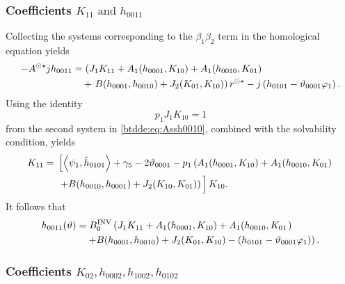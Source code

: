 \subsubsection{Coefficients \texorpdfstring{$K_{11} \text{ and } h_{0011}$}{K11
				and h0011}}

Collecting the systems corresponding to the $\beta_1 \beta_2$ term in the
homological equation yields
\begin{equation}
\label{btdde:eq:Assh0011}
\begin{aligned}
-A^{\odot\star} jh_{0011} &= \left(J_1 K_{11} + A_1(h_{0001},K_{10}) + A_1(h_{0010},K_{01}) \right. \\
						& \quad +
                        \left. B(h_{0001},h_{0010}) + J_2(K_{01},K_{10})\right)r^{\odot\star} - j\left(h_{0101}-\vartheta_{0001}\varphi_1\right).
\end{aligned}
\end{equation}
Using the identity 
%
\begin{equation*}
   p_1J_1K_{10}=1 
\end{equation*}
from the second system in \cref{btdde:eq:Assh0010}, combined with the solvability
condition, yields
\begin{equation}
\begin{aligned}
    K_{11}={}& \left[\left< \psi_1, \hat h_{0101} \right> + \gamma_5 - 2\vartheta_{0001} 
                 - p_1\left(A_1(h_{0001},K_{10}) + A_1(h_{0010},K_{01}) \right. \right. \nonumber\\
             &\left.\left. + B(h_{0010},h_{0001}) + J_2(K_{10},K_{01}) \right)\vphantom{\left< \psi_1, \hat h_{0101} \right>} \right]K_{10}.
\end{aligned}
\end{equation}
It follows that 
\begin{equation}
\begin{aligned}
h_{0011}(\vartheta) &= B^{\mathrm{INV}}_{0} \left( J_1 K_{11} + A_1(h_{0001},K_{10}) + A_1(h_{0010},K_{01} \right.) \\
						& \left. \quad + B(h_{0001},h_{0010}) + J_2(K_{01},K_{10})-\left(h_{0101}-\vartheta_{0001}\varphi_1\right)\right).
\end{aligned}
\end{equation}

\subsubsection{Coefficients
				\texorpdfstring{$K_{02},h_{0002},h_{1002},h_{0102}$}
				{h0002,K02,h1002,h0102}}

